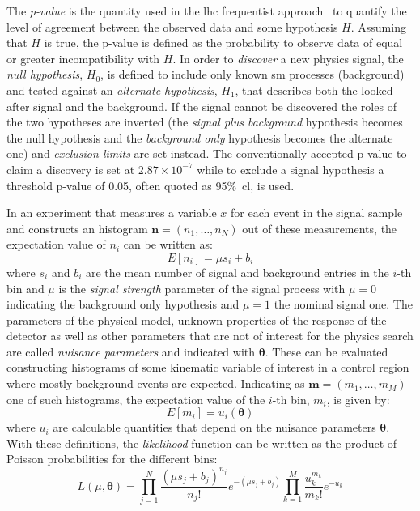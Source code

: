 The \emph{p-value} is the quantity used in the \gls{lhc} frequentist
approach~\cite{StatProcedure} to quantify the level of agreement between the
observed data and some hypothesis $H$. Assuming that $H$ is true, the p-value is
defined as the probability to observe data of equal or greater incompatibility
with $H$. In order to \emph{discover} a new physics signal, the \emph{null
  hypothesis}, $H_0$, is defined to include only known \gls{sm} processes
(background) and tested against an \emph{alternate hypothesis}, $H_1$, that
describes both the looked after signal and the background. If the signal cannot
be discovered the roles of the two hypotheses are inverted (the \emph{signal plus
  background} hypothesis becomes the null hypothesis and the \emph{background
  only} hypothesis becomes the alternate one) and \emph{exclusion limits} are
set instead. The conventionally accepted p-value to claim a discovery is set at
$2.87 \times 10^{-7}$ while to exclude a signal hypothesis a threshold p-value
of 0.05, often quoted as 95\%~\gls{cl}, is used.

In an experiment that measures a variable $x$ for each event in the signal
sample and constructs an histogram $\boldsymbol{n} = (n_1, \dots, n_N)$ out of
these measurements, the expectation value of $n_i$ can be written as:
\begin{equation}
  \label{eq:103}
  E[n_i] = \mu s_i + b_i
\end{equation}
where $s_i$ and $b_i$ are the mean number of signal and background entries in
the $i$-th bin and $\mu$ is the \emph{signal strength} parameter of the signal
process with $\mu = 0$ indicating the background only hypothesis and $\mu = 1$
the nominal signal one. The parameters of the physical model, unknown properties
of the response of the detector as well as other parameters that are not of
interest for the physics search are called \emph{nuisance parameters} and
indicated with $\boldsymbol{\theta}$. These can be evaluated constructing
histograms of some kinematic variable of interest in a control region where
mostly background events are expected. Indicating as
$\boldsymbol{m} = (m_1, \dots, m_M)$ one of such histograms, the expectation
value of the $i$-th bin, $m_i$, is given by:
\begin{equation}
  \label{eq:104}
  E[m_i] = u_i(\boldsymbol{\theta})
\end{equation}
where $u_i$ are calculable quantities that depend on the nuisance parameters
$\boldsymbol{\theta}$. With these definitions, the \emph{likelihood} function
can be written as the product of Poisson probabilities for the different bins:
\begin{equation}
  \label{eq:105}
  L(\mu, \boldsymbol{\theta}) = \prod_{j = 1}^N \frac{(\mu s_j +
    b_j)^{n_j}}{n_j!} e^{-(\mu s_j + b_j)} \prod_{k = 1}^M
  \frac{u_k^{m_k}}{m_k!} e^{-u_k}
\end{equation}

